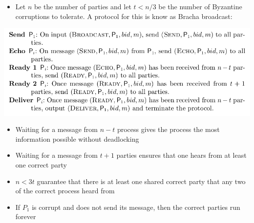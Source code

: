 \documentclass[11pt]{article}
\begin{document}
\begin{itemize}
\item Let \(n\) be the number of parties and let \(t <n/3\) be the number of Byzantine corruptions to tolerate. A protocol for this is know as Bracha broadcast:
\end{itemize}
\begin{center}
\includegraphics[width=.9\linewidth]{Asynchronous Agreement (8)/screenshot_2018-09-29_17-02-13.png}
\end{center}

\begin{itemize}
\item Waiting for a message from \(n-t\) process gives the process the most information possible without deadlocking
\item Waiting for a message from \(t+1\) parties ensures that one hears from at least one correct party
\item \(n<3t\) guarantee that there is at least one shared correct party that any two of the correct process heard from
\item If \(P_1\) is corrupt and does not send its message, then the correct parties run forever
\end{itemize}
\end{document}
